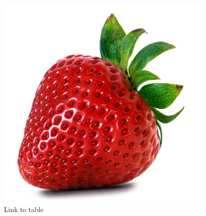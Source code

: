 \begin{figure}
\centering
\includegraphics[width=0.5\linewidth]{Figures/strawberry.png}
\caption{Link to table}
\end{figure}